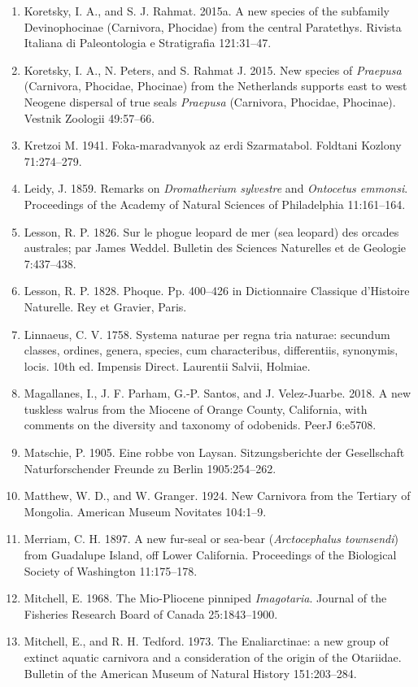 \documentclass[a4paper, 12pt]{article}
\begin{document}
\begin{enumerate}
\item Koretsky, I. A., and S. J. Rahmat. 2015a. A new species of the subfamily Devinophocinae (Carnivora, Phocidae) from the central Paratethys. Rivista Italiana di Paleontologia e Stratigrafia 121:31–47.
\item Koretsky, I. A., N. Peters, and S. Rahmat J. 2015. New species of \textit{Praepusa} (Carnivora, Phocidae, Phocinae) from the Netherlands supports east to west Neogene dispersal of true seals \textit{Praepusa} (Carnivora, Phocidae, Phocinae). Vestnik Zoologii 49:57–66.
\item Kretzoi M. 1941. Foka-maradvanyok az erdi Szarmatabol. Foldtani Kozlony 71:274–279.
\item Leidy, J. 1859. Remarks on \textit{Dromatherium sylvestre} and \textit{Ontocetus emmonsi}. Proceedings of the Academy of Natural Sciences of Philadelphia 11:161–164.
\item Lesson, R. P. 1826. Sur le phogue leopard de mer (sea leopard) des orcades australes; par James Weddel. Bulletin des Sciences Naturelles et de Geologie 7:437–438.
\item Lesson, R. P. 1828. Phoque. Pp. 400–426 in Dictionnaire Classique d'Histoire Naturelle. Rey et Gravier, Paris.
\item Linnaeus, C. V. 1758. Systema naturae per regna tria naturae: secundum classes, ordines, genera, species, cum characteribus, differentiis, synonymis, locis. 10th ed. Impensis Direct. Laurentii Salvii, Holmiae.
\item Magallanes, I., J. F. Parham, G.-P. Santos, and J. Velez-Juarbe. 2018. A new tuskless walrus from the Miocene of Orange County, California, with comments on the diversity and taxonomy of odobenids. PeerJ 6:e5708.
\item Matschie, P. 1905. Eine robbe von Laysan. Sitzungsberichte der Gesellschaft Naturforschender Freunde zu Berlin 1905:254–262.
\item Matthew, W. D., and W. Granger. 1924. New Carnivora from the Tertiary of Mongolia. American Museum Novitates 104:1–9.
\item Merriam, C. H. 1897. A new fur-seal or sea-bear (\textit{Arctocephalus townsendi}) from Guadalupe Island, off Lower California. Proceedings of the Biological Society of Washington 11:175–178.
\item Mitchell, E. 1968. The Mio-Pliocene pinniped \textit{Imagotaria}. Journal of the Fisheries Research Board of Canada 25:1843–1900.
\item Mitchell, E., and R. H. Tedford. 1973. The Enaliarctinae: a new group of extinct aquatic carnivora and a consideration of the origin of the Otariidae. Bulletin of the American Museum of Natural History 151:203–284.

\end{enumerate}
\end{document}
